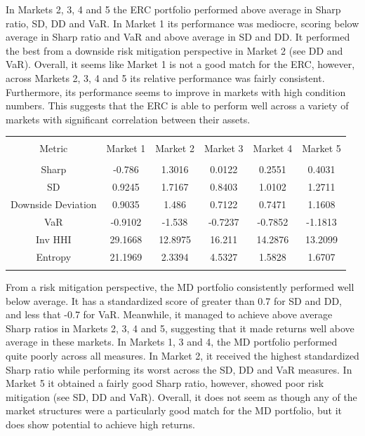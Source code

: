 \documentclass[11pt,preprint, authoryear]{elsarticle}
\let\origtable\table
\let\endorigtable\endtable
\renewenvironment{table}[1][2] {
    \expandafter\origtable\expandafter[H]
} {
    \endorigtable
}
\numberwithin{equation}{section}
\numberwithin{figure}{section}
\numberwithin{table}{section}
\begin{document}
In Markets 2, 3, 4 and 5 the ERC portfolio performed above average in
Sharp ratio, SD, DD and VaR. In Market 1 its performance was mediocre,
scoring below average in Sharp ratio and VaR and above average in SD and
DD. It performed the best from a downside risk mitigation perspective in
Market 2 (see DD and VaR). Overall, it seems like Market 1 is not a good
match for the ERC, however, across Markets 2, 3, 4 and 5 its relative
performance was fairly consistent. Furthermore, its performance seems to
improve in markets with high condition numbers. This suggests that the
ERC is able to perform well across a variety of markets with significant
correlation between their assets.

\begin{table}[!htbp] \centering 
  \caption{Maximum Diversification} 
  \label{md} 
\begin{tabular}{@{\extracolsep{5pt}} cccccc} 
\\[-1.8ex]\hline 
\hline \\[-1.8ex] 
Metric & Market 1 & Market 2 & Market 3 & Market 4 & Market 5 \\ 
\hline \\[-1.8ex] 
Sharp & -0.786 & 1.3016 & 0.0122 & 0.2551 & 0.4031 \\ 
SD & 0.9245 & 1.7167 & 0.8403 & 1.0102 & 1.2711 \\ 
Downside Deviation & 0.9035 & 1.486 & 0.7122 & 0.7471 & 1.1608 \\ 
VaR & -0.9102 & -1.538 & -0.7237 & -0.7852 & -1.1813 \\ 
Inv HHI & 29.1668 & 12.8975 & 16.211 & 14.2876 & 13.2099 \\ 
Entropy & 21.1969 & 2.3394 & 4.5327 & 1.5828 & 1.6707 \\ 
\hline \\[-1.8ex] 
\end{tabular} 
\end{table}

From a risk mitigation perspective, the MD portfolio consistently
performed well below average. It has a standardized score of greater
than 0.7 for SD and DD, and less that -0.7 for VaR. Meanwhile, it
managed to achieve above average Sharp ratios in Markets 2, 3, 4 and 5,
suggesting that it made returns well above average in these markets. In
Markets 1, 3 and 4, the MD portfolio performed quite poorly across all
measures. In Market 2, it received the highest standardized Sharp ratio
while performing its worst across the SD, DD and VaR measures. In Market
5 it obtained a fairly good Sharp ratio, however, showed poor risk
mitigation (see SD, DD and VaR). Overall, it does not seem as though any
of the market structures were a particularly good match for the MD
portfolio, but it does show potential to achieve high returns.
\end{document}
